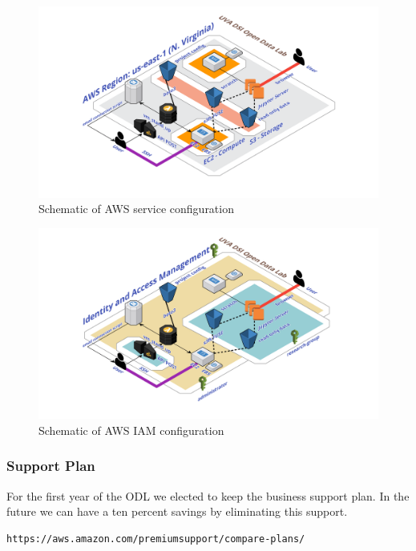 \begin{figure}[!hbtp]
\includegraphics[width=\textwidth]{images/odl-diagram.png}
\caption{Schematic of AWS service  configuration\label{fg:aws}}
\end{figure}
\begin{figure}[!hbtp]
\includegraphics[width=\textwidth]{images/odl-iam.png}
\caption{Schematic of AWS IAM configuration\label{fg:iam}}
\end{figure}



\subsubsection{Support Plan}
For the first year of the ODL we elected to keep the business support plan. In the future we can have a ten percent savings by eliminating this support.
\begin{verbatim}
https://aws.amazon.com/premiumsupport/compare-plans/
\end{verbatim}

